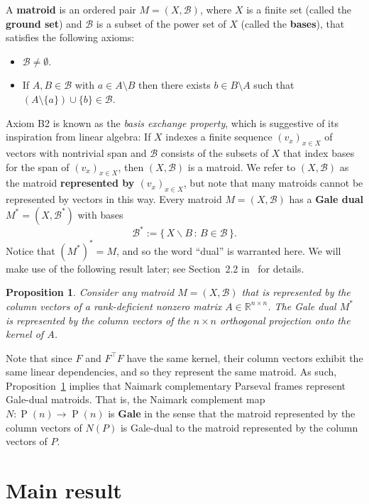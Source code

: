\documentclass[12pt]{article}
\theoremstyle{plain}
\newtheorem{prop}[thm]{Proposition}
\theoremstyle{definition}
\theoremstyle{remark}
\newcommand{\oP}{\operatorname{P}}
\newcommand{\cB}{\mathcal{B}}
\newcommand{\bR}{\mathbb{R}}
\begin{document}
A \textbf{matroid} is an ordered pair $M=(X, \cB)$, where $X$ is a finite set (called the \textbf{ground set}) and $\cB$ is a subset of the power set of $X$
(called the \textbf{bases}), that satisfies the following axioms:
\begin{itemize}
\item[(B1)] $\cB \neq \emptyset$.
\item[(B2)] If $A,B \in \cB$ with $a \in A\setminus B$ then there exists $b \in B\setminus A$ such that $(A \setminus \{a\}) \cup \{b\} \in \cB$.
\end{itemize}
Axiom B2 is known as the \textit{basis exchange property}, which is suggestive of its inspiration from linear algebra:
If $X$ indexes a finite sequence $(v_x)_{x\in X}$ of vectors with nontrivial span and $\cB$ consists of the subsets of $X$ that index bases for the span of $(v_x)_{x\in X}$, then $(X,\cB)$ is a matroid.
We refer to $(X,\cB)$ as the matroid \textbf{represented by $(v_x)_{x\in X}$}, but note that many matroids cannot be represented by vectors in this way. 
Every matroid $M=(X,\cB)$ has a \textbf{Gale dual} $M^\ast=(X,\cB^\ast)$ with bases
\[
\cB^\ast
:= \big\{ \, X \backslash B \, : \, B \in \cB \, \big\}.
\]
Notice that $(M^*)^*=M$, and so the word ``dual'' is warranted here.
We will make use of the following result later; see Section~2.2 in~\cite{oxley2011matroid} for details.

\begin{prop}
\label{prop:matroid}
Consider any matroid $M=(X,\cB)$ that is represented by the column vectors of a rank-deficient nonzero matrix $A\in\bR^{n\times n}$.
The Gale dual $M^\ast$ is represented by the column vectors of the $n \times n$ orthogonal projection onto the kernel of $A$.
\end{prop}

Note that since $F$ and $F^\top F$ have the same kernel, their column vectors exhibit the same linear dependencies, and so they represent the same matroid.
As such, Proposition~\ref{prop:matroid} implies that Naimark complementary Parseval frames represent Gale-dual matroids.
That is, the Naimark complement map $N\colon\oP(n)\to\oP(n)$ is \textbf{Gale} in the sense that the matroid represented by the column vectors of $N(P)$ is Gale-dual to the matroid represented by the column vectors of $P$.

\section{Main result}
\end{document}
